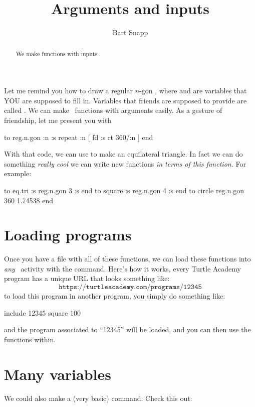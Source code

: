 \documentclass[noauthor,nooutcomes,12pt]{ximera}
\title{Arguments and inputs}
\author{Bart Snapp}
\begin{document}
\begin{abstract}
  We make functions with inputs.
\end{abstract}
\maketitle

\nameblankgen

\begin{multicols*}{2}

  Let me remind you how to draw a regular $n$-gon , where  and  are variables that
  YOU are supposed to fill in. Variables that friends are supposed to
  provide are called .  We can make \LOGO\ functions
  with arguments easily. As a gesture of friendship, let me present you with 
\begin{logo}
to reg.n.gon :n :s
  repeat :n [ fd :s rt 360/:n ]
end
\end{logo}
With that code, we can use  to make an equilateral
triangle. In fact we can do something \emph{really cool} we can
write new functions \textit{in terms of this function.} For example:
\begin{logo}
to eq.tri :s reg.n.gon 3 :s end
to square :s reg.n.gon 4 :s end
to circle reg.n.gon 360 1.74538 end
\end{logo}

\section{Loading programs}

Once you have a file with all of these functions, we can load these
functions into \emph{any} \LOGO\ activity with the 
command. Here's how it works, every Turtle Academy program has a
unique URL that looks something like:
\[
\texttt{https://turtleacademy.com/programs/12345}
\]
to load this program in another program, you simply do something like:
\begin{logo}
include 12345
square 100  
\end{logo}
and the program associated to ``12345'' will be loaded, and you can
then use the functions within.


\section{Many variables}

We could also make a (very basic)  command. Check this out:


\end{multicols*}
\end{document}

